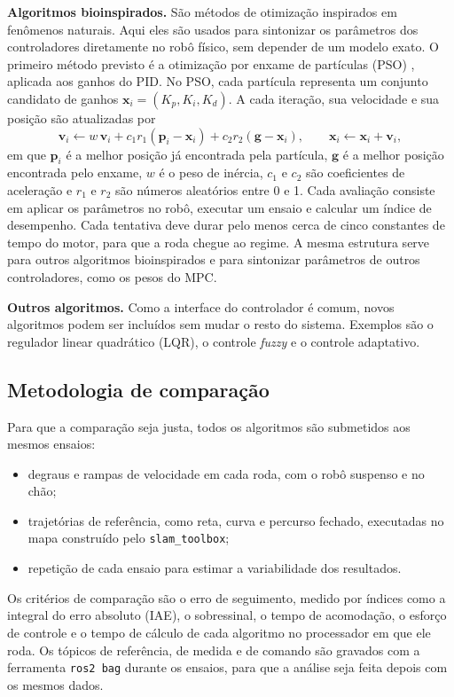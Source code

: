 \textbf{Algoritmos bioinspirados.} São métodos de otimização inspirados em
fenômenos naturais. Aqui eles são usados para sintonizar os parâmetros dos
controladores diretamente no robô físico, sem depender de um modelo
exato. O primeiro método previsto é a otimização por enxame de partículas
(PSO) \cite{kennedy1995pso}, aplicada aos ganhos do PID. No PSO, cada
partícula representa um conjunto candidato de ganhos
$\mathbf{x}_i = (K_p, K_i, K_d)$. A cada iteração, sua velocidade e sua
posição são atualizadas por
\begin{equation}
	\label{eq:pso}
	\mathbf{v}_i \leftarrow w\,\mathbf{v}_i
		+ c_1 r_1 (\mathbf{p}_i - \mathbf{x}_i)
		+ c_2 r_2 (\mathbf{g} - \mathbf{x}_i), \qquad
	\mathbf{x}_i \leftarrow \mathbf{x}_i + \mathbf{v}_i,
\end{equation}
em que $\mathbf{p}_i$ é a melhor posição já encontrada pela partícula,
$\mathbf{g}$ é a melhor posição encontrada pelo enxame, $w$ é o peso de
inércia, $c_1$ e $c_2$ são coeficientes de aceleração e $r_1$ e $r_2$ são
números aleatórios entre 0 e 1. Cada avaliação consiste em aplicar os
parâmetros no robô, executar um ensaio e calcular um índice de
desempenho. Cada tentativa deve durar pelo menos cerca de cinco constantes
de tempo do motor, para que a roda chegue ao regime. A mesma estrutura
serve para outros algoritmos bioinspirados e para sintonizar parâmetros
de outros controladores, como os pesos do MPC.

\textbf{Outros algoritmos.} Como a interface do controlador é comum, novos
algoritmos podem ser incluídos sem mudar o resto do sistema. Exemplos são
o regulador linear quadrático (LQR), o controle \textit{fuzzy} e o
controle adaptativo.

\subsection{Metodologia de comparação}

Para que a comparação seja justa, todos os algoritmos são submetidos aos
mesmos ensaios:

\begin{itemize}
	\item degraus e rampas de velocidade em cada roda, com o robô suspenso
	e no chão;
	\item trajetórias de referência, como reta, curva e percurso fechado,
	executadas no mapa construído pelo \texttt{slam\_toolbox};
	\item repetição de cada ensaio para estimar a variabilidade dos
	resultados.
\end{itemize}

Os critérios de comparação são o erro de seguimento, medido por índices
como a integral do erro absoluto (IAE), o sobressinal, o tempo de
acomodação, o esforço de controle e o tempo de cálculo de cada algoritmo
no processador em que ele roda. Os tópicos de referência, de medida e de
comando são gravados com a ferramenta \texttt{ros2 bag} durante os
ensaios, para que a análise seja feita depois com os mesmos dados.

